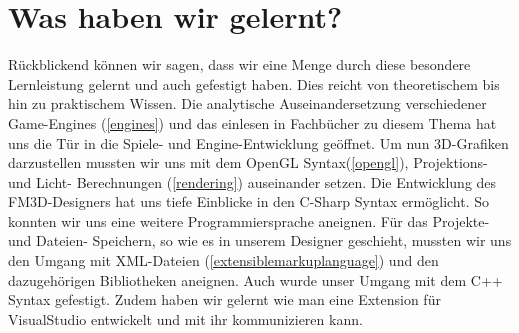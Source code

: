 \section{Was haben wir gelernt?}
Rückblickend können wir sagen, dass wir eine Menge durch diese besondere Lernleistung gelernt und auch gefestigt haben. Dies reicht von theoretischem bis hin zu praktischem Wissen. 
Die analytische Auseinandersetzung verschiedener Game-Engines (\cref{engines}) und das einlesen in Fachbücher zu diesem Thema hat uns die Tür in die Spiele- und Engine-Entwicklung geöffnet. Um nun 3D-Grafiken darzustellen mussten wir uns mit dem OpenGL Syntax(\cref{opengl}), Projektions- und Licht- Berechnungen (\cref{rendering}) auseinander setzen.
Die Entwicklung des FM3D-Designers hat uns tiefe Einblicke in den C-Sharp Syntax ermöglicht. So konnten wir uns eine weitere Programmiersprache aneignen. Für das Projekte- und Dateien- Speichern, so wie es in unserem Designer geschieht, mussten wir uns den Umgang mit XML-Dateien (\cref{extensiblemarkuplanguage}) und den dazugehörigen Bibliotheken aneignen.  Auch wurde unser Umgang mit dem C++ Syntax gefestigt. Zudem haben wir gelernt wie man eine Extension für VisualStudio entwickelt und mit ihr kommunizieren kann.